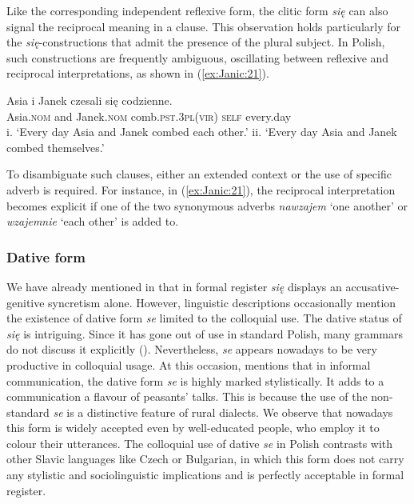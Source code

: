 \documentclass[output=paper]{langscibook}
\begin{document}
Like the corresponding independent reflexive form, the clitic form \textit{się} can also signal the reciprocal meaning in a clause. This observation holds particularly for the \textit{się}-constructions that admit the presence of the plural subject. In Polish, such constructions are frequently ambiguous, oscillating between reflexive and reciprocal interpretations, as shown in (\ref{ex:Janic:21}). 

\ea \label{ex:Janic:21}
\gll Asia	 i	Janek	 czesali	 się	 codzienne. \\
	 Asia.\textsc{nom}	and	Janek.\textsc{nom} 	 comb.\textsc{pst.3pl(vir)}	\textsc{self}	every.day\\
\glt i. ‘Every day Asia and Janek combed each other.’
\glt ii. ‘Every day Asia and Janek combed themselves.’ \citep[515]{Wiemer2007}
\z 
	
To disambiguate such clauses, either an extended context or the use of specific adverb is required. For instance, in (\ref{ex:Janic:21}), the reciprocal interpretation becomes explicit if one of the two synonymous adverbs \textit{nawzajem} ‘one another’ or \textit{wzajemnie} ‘each other’ is added to.


\subsubsection{Dative form} \label{sec:Janic:3.2.2}

We have already mentioned in  that in formal register \textit{się} displays an accusative-genitive syncretism alone. However, linguistic descriptions occasionally mention the existence of dative form \textit{se} limited to the colloquial use. The dative status of \textit{się} is intriguing. Since it has gone out of use in standard Polish, many grammars do not discuss it explicitly (\citealt{Feldstein2001, Swan2003, Sadowska2012}). Nevertheless, \textit{se} appears nowadays to be very productive in colloquial usage. At this occasion, \citet{Swan2002} mentions that in informal communication, the dative form \textit{se} is highly marked stylistically. It adds to a communication a flavour of peasants’ talks. This is because the use of the non-standard \textit{se} is a distinctive feature of rural dialects. We observe that nowadays this form is widely accepted even by well-educated people, who employ it to colour their utterances. The colloquial use of dative \textit{se} in Polish contrasts with other Slavic languages like Czech or Bulgarian, in which this form does not carry any stylistic and sociolinguistic implications and is perfectly acceptable in formal register. 
\end{document}
